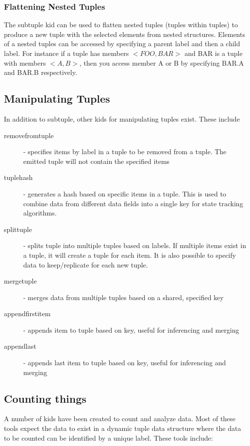 \documentclass[11pt]{article}
\begin{document}
\subsubsection{Flattening Nested Tuples}
The subtuple kid can be used to flatten nested tuples (tuples within tuples) to produce a new tuple
with the selected elements from nested structures.  Elements of a nested tuples can be accessed by
specifying a parent label and then a child label.  For instance if a tuple has members $<FOO, BAR>$
and BAR is a tuple with members $<A, B>$, then you access member A or B by specifying BAR.A and
BAR.B respectively.

\subsection {Manipulating Tuples}
In addition to subtuple, other kids for manipulating tuples exist.  These include
\begin{description}
\item [removefromtuple] - specifies items by label in a tuple to be removed from a tuple. The emitted tuple will not contain the specified items
\item [tuplehash] - generates a hash based on specific items in a tuple.  This is used to combine
data from different data fields into a single key for state tracking algorithms.
\item [splittuple] - splits tuple into multiple tuples based on labels.  If multiple items exist in
a tuple, it will create a tuple for each item.  It is also possible to specify data to
keep/replicate for each new tuple.
\item [mergetuple] - merges data from multiple tuples based on a shared, specified key
\item [appendfirstitem] - appends item to tuple based on key, useful for inferencing and merging
\item [appendlast] - appends last item to tuple based on key, useful for inferencing and merging
\end{description}


\subsection {Counting things}
A number of kids have been created to count and analyze data.  Most of these tools expect the data
to exist in a dynamic tuple data structure where the data to be counted can be identified by a
unique label.  These tools include:
\end{document}
